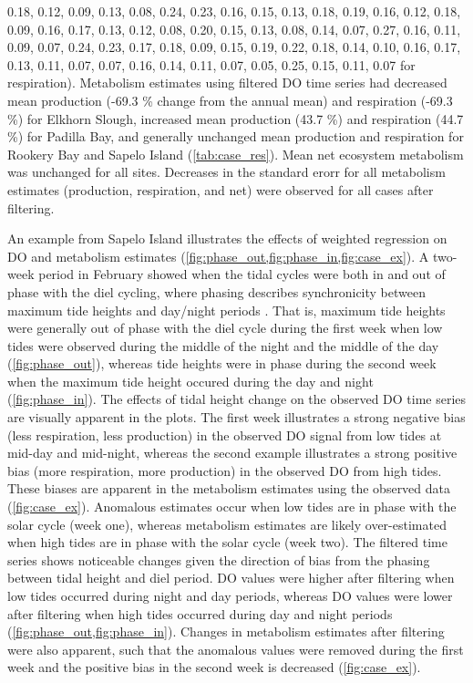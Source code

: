 \documentclass[letterpaper,12pt,oneside]{article}\usepackage[]{graphicx}\usepackage[]{color}
\begin{document}
0.18, 0.12, 0.09, 0.13, 0.08, 0.24, 0.23, 0.16, 0.15, 0.13, 0.18, 0.19, 0.16, 0.12, 0.18, 0.09, 0.16, 0.17, 0.13, 0.12, 0.08, 0.20, 0.15, 0.13, 0.08, 0.14, 0.07, 0.27, 0.16, 0.11, 0.09, 0.07, 0.24, 0.23, 0.17, 0.18, 0.09, 0.15, 0.19, 0.22, 0.18, 0.14, 0.10, 0.16, 0.17, 0.13, 0.11, 0.07, 0.07, 0.16, 0.14, 0.11, 0.07, 0.05, 0.25, 0.15, 0.11, 0.07 for respiration).  Metabolism estimates using filtered \ac{DO} time series had decreased mean production (-69.3 \% change from the annual mean) and respiration (-69.3 \%) for Elkhorn Slough, increased mean production (43.7 \%) and respiration (44.7 \%) for Padilla Bay, and generally unchanged mean production and respiration for Rookery Bay and Sapelo Island (\cref{tab:case_res}).  Mean net ecosystem metabolism was unchanged for all sites.  Decreases in the standard erorr for all metabolism estimates (production, respiration, and net) were observed for all cases after filtering.  

An example from Sapelo Island illustrates the effects of weighted regression on \ac{DO} and metabolism estimates (\cref{fig:phase_out,fig:phase_in,fig:case_ex}).   A two-week period in February showed when the tidal cycles were both in and out of phase with the diel cycling, where phasing describes synchronicity between maximum tide heights and day/night periods \citep{Nidzieko14}.  That is, maximum tide heights were generally out of phase with the diel cycle during the first week when low tides were observed during the middle of the night and the middle of the day (\cref{fig:phase_out}), whereas tide heights were in phase during the second week when the maximum tide height occured during the day and night (\cref{fig:phase_in}).  The effects of tidal height change on the observed \ac{DO} time series are visually apparent in the plots. The first week illustrates a strong negative bias (less respiration, less production) in the observed \ac{DO} signal from low tides at mid-day and mid-night, whereas the second example illustrates a strong positive bias (more respiration, more production) in the observed \ac{DO} from high tides. These biases are apparent in the metabolism estimates using the observed data (\cref{fig:case_ex}).  Anomalous estimates occur when low tides are in phase with the solar cycle (week one), whereas metabolism estimates are likely over-estimated when high tides are in phase with the solar cycle (week two).  The filtered time series shows noticeable changes given the direction of bias from the phasing between tidal height and diel period.  \ac{DO} values were higher after filtering when low tides occurred during night and day periods, whereas \ac{DO} values were lower after filtering when high tides occurred during day and night periods (\cref{fig:phase_out,fig:phase_in}).  Changes in metabolism estimates after filtering were also apparent, such that the anomalous values were removed during the first week and the positive bias in the second week is decreased (\cref{fig:case_ex}).
\end{document}
